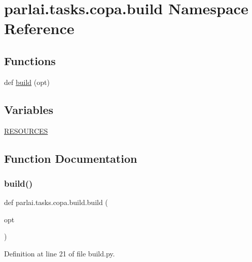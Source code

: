 \hypertarget{namespaceparlai_1_1tasks_1_1copa_1_1build}{}\section{parlai.\+tasks.\+copa.\+build Namespace Reference}
\label{namespaceparlai_1_1tasks_1_1copa_1_1build}
\subsection*{Functions}
\begin{DoxyCompactItemize}
\item 
def \hyperlink{namespaceparlai_1_1tasks_1_1copa_1_1build_a20917f15c830f6a3c2af55808ee584bf}{build} (opt)
\end{DoxyCompactItemize}
\subsection*{Variables}
\begin{DoxyCompactItemize}
\item 
\hyperlink{namespaceparlai_1_1tasks_1_1copa_1_1build_ad9dfd8b7ed83d50eb17b458d3c93a019}{R\+E\+S\+O\+U\+R\+C\+ES}
\end{DoxyCompactItemize}


\subsection{Function Documentation}
\mbox{\label{namespaceparlai_1_1tasks_1_1copa_1_1build_a20917f15c830f6a3c2af55808ee584bf}} 
\subsubsection{\texorpdfstring{build()}{build()}}
{\footnotesize\ttfamily def parlai.\+tasks.\+copa.\+build.\+build (\begin{DoxyParamCaption}\item[{}]{opt }\end{DoxyParamCaption})}



Definition at line 21 of file build.\+py.



